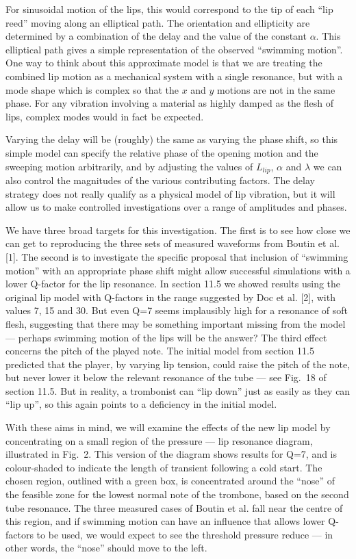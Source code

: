   For sinusoidal motion of the lips, this would correspond to the tip of each 
  ``lip reed'' moving along an elliptical path. The orientation and ellipticity 
  are determined by a combination of the delay and the value of the constant 
  $\alpha$. This elliptical path gives a simple representation of the observed 
  ``swimming motion''. One way to think about this approximate model is that we 
  are treating the combined lip motion as a mechanical system with a single 
  resonance, but with a mode shape which is complex so that the $x$ and $y$ 
  motions are not in the same phase. For any vibration involving a material as 
  highly damped as the flesh of lips, complex modes would in fact be expected. 

  Varying the delay will be (roughly) the same as varying the phase shift, so 
  this simple model can specify the relative phase of the opening motion and 
  the sweeping motion arbitrarily, and by adjusting the values of $L_{lip}$, 
  $\alpha$ and $\lambda$ we can also control the magnitudes of the various 
  contributing factors. The delay strategy does not really qualify as a 
  physical model of lip vibration, but it will allow us to make controlled 
  investigations over a range of amplitudes and phases. 

  We have three broad targets for this investigation. The first is to see how 
  close we can get to reproducing the three sets of measured waveforms from 
  Boutin et al. [1]. The second is to investigate the specific proposal that 
  inclusion of ``swimming motion'' with an appropriate phase shift might allow 
  successful simulations with a lower Q-factor for the lip resonance. In 
  section 11.5 we showed results using the original lip model with Q-factors in 
  the range suggested by Doc et al. [2], with values 7, 15 and 30. But even Q=7 
  seems implausibly high for a resonance of soft flesh, suggesting that there 
  may be something important missing from the model --- perhaps swimming motion 
  of the lips will be the answer? The third effect concerns the pitch of the 
  played note. The initial model from section 11.5 predicted that the player, 
  by varying lip tension, could raise the pitch of the note, but never lower it 
  below the relevant resonance of the tube --- see Fig.\ 18 of section 11.5. 
  But in reality, a trombonist can ``lip down'' just as easily as they can 
  ``lip up'', so this again points to a deficiency in the initial model. 

  With these aims in mind, we will examine the effects of the new lip model by 
  concentrating on a small region of the pressure --- lip resonance diagram, 
  illustrated in Fig.\ 2. This version of the diagram shows results for Q=7, 
  and is colour-shaded to indicate the length of transient following a cold 
  start. The chosen region, outlined with a green box, is concentrated around 
  the ``nose'' of the feasible zone for the lowest normal note of the trombone, 
  based on the second tube resonance. The three measured cases of Boutin et al. 
  fall near the centre of this region, and if swimming motion can have an 
  influence that allows lower Q-factors to be used, we would expect to see the 
  threshold pressure reduce — in other words, the ``nose'' should move to the 
  left. 

